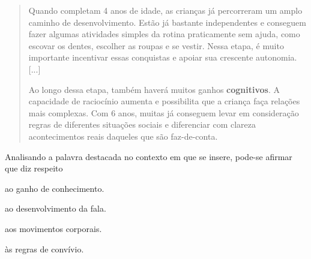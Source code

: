 \begin{escolha}
\begin{escolha}
\begin{escolha}
\begin{quote}
Quando completam 4 anos de idade, as crianças já percorreram um amplo
caminho de desenvolvimento. Estão já bastante independentes e conseguem
fazer algumas atividades simples da rotina praticamente sem ajuda, como
escovar os dentes, escolher as roupas e se vestir. Nessa etapa, é muito
importante incentivar essas conquistas e apoiar sua crescente autonomia.
{[}...{]}

Ao longo dessa etapa, também haverá muitos ganhos \textbf{cognitivos}. A
capacidade de raciocínio aumenta e possibilita que a criança faça
relações mais complexas. Com 6 anos, muitas já conseguem levar em
consideração regras de diferentes situações sociais e diferenciar com
clareza acontecimentos reais daqueles que são faz-de-conta.
\end{quote}


Analisando a palavra destacada no contexto em que se insere, 
pode-se afirmar que diz respeito

\begin{escolha}
\item ao ganho de conhecimento.

\item ao desenvolvimento da fala.

\item aos movimentos corporais.

\item às regras de convívio.
\end{escolha}



\end{escolha}
\end{escolha}
\end{escolha}
